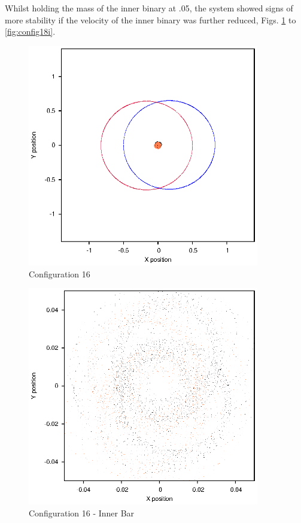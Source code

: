 \documentclass[a4paper,12pt]{article}
\begin{document}
Whilst holding the mass of the inner binary at .05, the system showed signs of more stability if the velocity of the inner binary was further reduced, Figs. \ref{fig:config16} to \ref{fig:config18i}.
\begin{figure}[H]
\centering
\includegraphics[width=0.9\textwidth]{./2017results/05-75-045-4/Orbit.eps}
\caption{Configuration 16}
\label{fig:config16}
\end{figure}
\begin{figure}[H]
\centering
\includegraphics[width=0.9\textwidth]{./2017results/05-75-045-4/Inner.eps}
\caption{Configuration 16 - Inner Bar}
\label{fig:config16i}
\end{figure}
\end{document}
